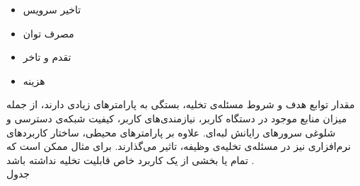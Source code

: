 \begin{multicols}{2}
	\begin{itemize}
		\item تاخیر سرویس
		\item مصرف توان
		\item تقدم و تاخر
		\item هزینه
	\end{itemize}
\end{multicols}
مقدار توابع هدف و شروط مسئله‌ی تخلیه، بستگی به پارامترهای زیادی دارند، از جمله میزان منابع موجود در دستگاه کاربر، نیازمندی‌های کاربر، کیفیت شبکه‌ی دسترسی و شلوغی سرورهای رایانش لبه‌ای. علاوه بر پارامترهای محیطی، ساختار کاربردهای نرم‌افزاری نیز در مسئله‌ی تخلیه‌ی وظیفه، تاثیر می‌گذارند. برای مثال ممکن است که تمام یا بخشی از یک کاربرد خاص قابلیت تخلیه نداشته باشد \Cite{mach}. \\
جدول
